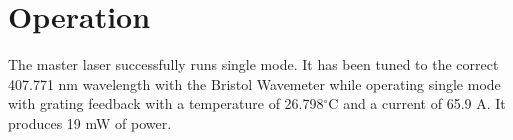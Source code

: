  
\section{Operation}

The master laser successfully runs single mode. It has been tuned to the correct 407.771 nm wavelength with the Bristol Wavemeter while operating single mode with grating feedback with a temperature of 26.798$^\circ$C and a current of 65.9 A. It produces 19 mW of power. 




